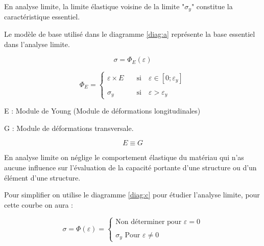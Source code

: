 \documentclass[12pt,a4paper]{report}
\newcommand{\sgma}[1]{\sigma_{#1}}
\begin{document}
	
	
	
	
	
	
	
	
	
	
	
	
	
	
	
	
	
	
	
	En analyse limite, la limite élastique voisine de la limite "$\sgma{y}$" constitue la caractéristique essentiel.
	
	
	Le modèle de base utilisé dans le diagramme \ref{diag:a} représente la base essentiel dans l'analyse limite.
	
	\[ \sigma = \varPhi_{E}(\varepsilon) \]
	
	\begin{equation}
		\varPhi_{E} = \begin{cases}
			\varepsilon \times E \quad&\text{si}\quad \varepsilon\in[0;\varepsilon_{y}] \\ \\
			\sgma{y} \quad&\text{si}\quad \varepsilon > \varepsilon_{y}
		\end{cases}
		\label{eq:1}
	\end{equation}
	
	
	\begin{tcolorbox}[colback=gray!20, colframe=black, title=Remarque]
		E : Module de Young (Module de déformations longitudinales)
		
		G : Module de déformations transversale.
		
		\[ E \equiv G \]
	\end{tcolorbox}
	
	
	En analyse limite on néglige le comportement élastique du matériau qui n'as aucune influence sur l'évaluation de la capacité portante d'une structure ou d'un élément d'une structure.
	
	\vspace{\baselineskip}
	
	Pour simplifier on utilise le diagramme \ref{diag:c} pour étudier l'analyse limite, pour cette courbe on aura : 
	
	\begin{equation}
		\sigma = \varPhi(\varepsilon) = \begin{cases}
			\text{Non déterminer pour } \varepsilon = 0 \\ \\
			\sgma{y} \text{ Pour } \varepsilon \neq 0
		\end{cases}
		\label{eq:2}
	\end{equation}
	
\end{document}
